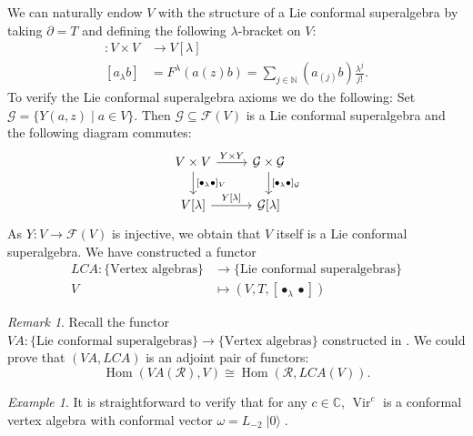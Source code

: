 \documentclass[a4paper, 12pt, reqno]{amsart}
\theoremstyle{remark}
\newtheorem{remark}[theorem]{Remark}
\newtheorem{example}[theorem]{Example}
\numberwithin{equation}{subsection}
\DeclareMathOperator{\Vir}{Vir}
\DeclareMathOperator{\vac}{|0\rangle}
\DeclareMathOperator{\Hom}{Hom}
\begin{document}
We can naturally endow $V$ with the structure of a Lie conformal superalgebra by taking $\partial = T$ and defining the following $\lambda$-bracket on $V$:
\begin{align*}
  [\bullet_{\lambda}\bullet]: V \times V &\to V[\lambda] \\
  [a_{\lambda}b] &= F^{\lambda}(a(z)b) = \sum_{j \in \mathbb{N}}(a_{(j)}b)\frac{\lambda^j}{j!}.
\end{align*}
To verify the Lie conformal superalgebra axioms we do the following:
Set $\mathcal{G}=\{Y(a,z)\mid a\in V\}$.
Then $\mathcal{G}\subseteq \mathcal{F}(V)$ is a Lie conformal superalgebra and the following diagram commutes:
\begin{equation*}
  \begin{tikzcd}
    V\times V \arrow[d, "{[\bullet_{\lambda}\bullet]_V}"] \arrow[r, "Y\times Y"] & \mathcal{G}\times\mathcal{G} \arrow[d, "{[\bullet_{\lambda}\bullet]_{\mathcal{G}}}"] \\
    {V[\lambda]} \arrow[r, "{Y[\lambda]}"]                       & {\mathcal{G}[\lambda]}                                                 
  \end{tikzcd}
\end{equation*}
As $Y: V \to \mathcal{F}(V)$ is injective, we obtain that $V$ itself is a Lie conformal superalgebra.
We have constructed a functor
\begin{align*}
  LCA: \{\text{Vertex algebras}\} &\to \{\text{Lie conformal superalgebras}\} \\
  V &\mapsto (V, T, [\bullet_{\lambda}\bullet])
\end{align*}

\begin{remark}
  \label{rmk:17}
  Recall the functor $VA: \{\text{Lie conformal superalgebras}\} \to \{\text{Vertex algebras}\}$ constructed in .
  We could prove that $(VA, LCA)$ is an adjoint pair of functors:
  \begin{equation*}
    \Hom(VA(\mathcal{R}), V) \cong \Hom(\mathcal{R}, LCA(V)).
  \end{equation*}
\end{remark}

\begin{example}
  \label{exa:8}
  It is straightforward to verify that for any $c \in \mathbb{C}$, $\Vir^c$ is a conformal vertex algebra with conformal vector $\omega = L_{-2}\vac$.
\end{example}
\end{document}
